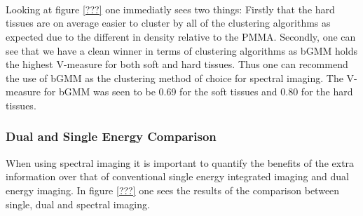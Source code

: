 \documentclass[11pt]{article}
\begin{document}
    \begin{center}
    \end{center}
    { \hspace*{\fill} \\}
    
    \begin{center}
    \end{center}
    { \hspace*{\fill} \\}
    


    \begin{center}
    \end{center}
    { \hspace*{\fill} \\}
    


    Looking at figure \ref{???} one immediatly sees two things: Firstly that
the hard tissues are on average easier to cluster by all of the
clustering algorithms as expected due to the different in density
relative to the PMMA. Secondly, one can see that we have a clean winner
in terms of clustering algorithms as bGMM holds the highest V-measure
for both soft and hard tissues. Thus one can recommend the use of bGMM
as the clustering method of choice for spectral imaging. The V-measure
for bGMM was seen to be 0.69 for the soft tissues and 0.80 for the hard
tissues.

    \hypertarget{dual-and-single-energy-comparison}{%
\subsubsection{Dual and Single Energy
Comparison}\label{dual-and-single-energy-comparison}}

    When using spectral imaging it is important to quantify the benefits of
the extra information over that of conventional single energy integrated
imaging and dual energy imaging. In figure \ref{???} one sees the
results of the comparison between single, dual and spectral imaging.





    \begin{center}
    \end{center}
    { \hspace*{\fill} \\}
    
\end{document}

